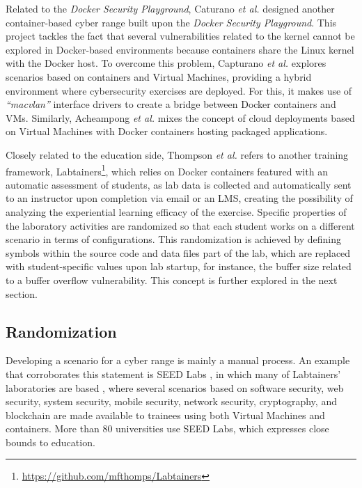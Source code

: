 
Related to the \textit{Docker Security Playground}, Caturano \textit{et al.} \cite{capturing_flags_ref} designed another container-based cyber range built upon the \textit{Docker Security Playground}. This project tackles the fact that several vulnerabilities related to the kernel cannot be explored in Docker-based environments because containers share the Linux kernel with the Docker host. To overcome this problem, Capturano \textit{et al.} explores scenarios based on containers and Virtual Machines, providing a hybrid environment where cybersecurity exercises are deployed. For this, it makes use of \textit{``macvlan''} interface drivers to create a bridge between Docker containers and VMs. Similarly, Acheampong \textit{et al.} \cite{security_scenarios_automation_ref} mixes the concept of cloud deployments based on Virtual Machines with Docker containers hosting packaged applications.

Closely related to the education side, Thompson \textit{et al.} \cite{labtainers_ref} refers to another training framework, Labtainers\footnote{\url{https://github.com/mfthomps/Labtainers}}, which relies on Docker containers featured with an automatic assessment of students, as lab data is collected and automatically sent to an instructor upon completion via email or an LMS, creating the possibility of analyzing the experiential learning efficacy of the exercise. Specific properties of the laboratory activities are randomized so that each student works on a different scenario in terms of configurations. This randomization is achieved by defining symbols within the source code and data files part of the lab, which are replaced with student-specific values upon lab startup, for instance, the buffer size related to a buffer overflow vulnerability. This concept is further explored in the next section.

\subsection{Randomization} \label{sec:randomization_cr}

Developing a scenario for a cyber range is mainly a manual process. An example that corroborates this statement is SEED Labs \cite{seed_labs_ref}, in which many of Labtainers' laboratories are based \cite{labtainers_ref}, where several scenarios based on software security, web security, system security, mobile security, network security, cryptography, and blockchain are made available to trainees using both Virtual Machines and containers. More than 80 universities use SEED Labs, which expresses close bounds to education.

